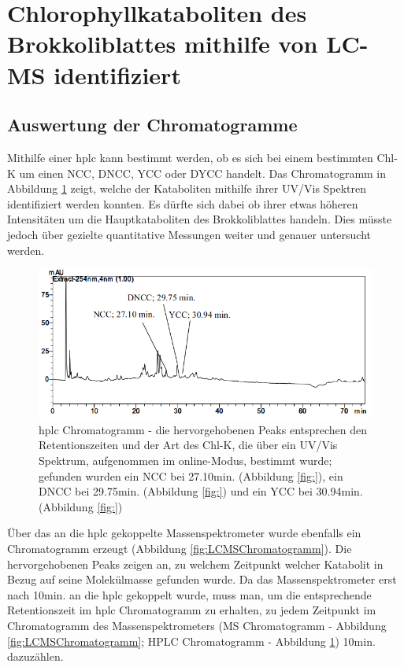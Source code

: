 \section{Chlorophyllkataboliten des Brokkoliblattes mithilfe von LC-MS identifiziert}

\subsection{Auswertung der Chromatogramme}

Mithilfe einer \gls{hplc} kann bestimmt werden, ob es sich bei einem bestimmten \gls{Chl-K} um einen NCC, DNCC, YCC oder DYCC handelt. Das Chromatogramm in Abbildung \ref{fig:HPLCChromatogramm} zeigt, welche der Kataboliten mithilfe ihrer UV/Vis Spektren identifiziert werden konnten. Es dürfte sich dabei ob ihrer etwas höheren Intensitäten um die Hauptkataboliten des Brokkoliblattes handeln. Dies müsste jedoch über gezielte quantitative Messungen weiter und genauer untersucht werden.

\begin{figure}[!htbp]
  
  \includegraphics[width=\textwidth]{figures/Kapitel6/keineReaktion/VWA_HPLC_Chromatogramm_keineReaktion.png}
  \caption[HPLC Chromatogramm vor der Reaktion, Quelle: Author]{\gls{hplc} Chromatogramm - die hervorgehobenen Peaks entsprechen den Retentionszeiten und der Art des \gls{Chl-K}, die über ein UV/Vis Spektrum, aufgenommen im online-Modus, bestimmt wurde; gefunden wurden ein \gls{NCC} bei 27.10min. (Abbildung \ref{fig:}), ein DNCC bei 29.75min. (Abbildung \ref{fig:}) und ein YCC bei 30.94min. (Abbildung \ref{fig:})}
  \label{fig:HPLCChromatogramm}
\end{figure}

Über das an die \gls{hplc} gekoppelte Massenspektrometer wurde ebenfalls ein Chromatogramm erzeugt (Abbildung \ref{fig:LCMSChromatogramm}). Die hervorgehobenen Peaks zeigen an, zu welchem Zeitpunkt welcher Katabolit in Bezug auf seine Molekülmasse gefunden wurde. Da das Massenspektrometer erst nach 10min. an die \gls{hplc} gekoppelt wurde, muss man, um die entsprechende Retentionszeit im \gls{hplc} Chromatogramm zu erhalten, zu jedem Zeitpunkt im Chromatogramm des Massenspektrometers (MS Chromatogramm - Abbildung \ref{fig:LCMSChromatogramm}; HPLC Chromatogramm - Abbildung \ref{fig:HPLCChromatogramm}) 10min. dazuzählen. 

